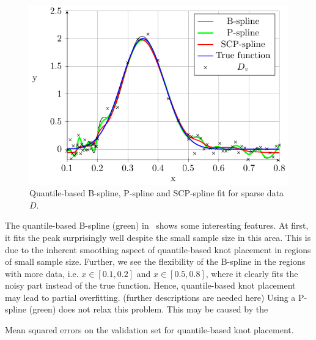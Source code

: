 \begin{figure}[H]
	\centering
	\includegraphics{graphics/pgfplots/cha4/exp-sparse-quantile.pdf}
	\caption{Quantile-based B-spline, P-spline and SCP-spline fit for sparse data $D$.}
	\label{fig:sparse-example-quantile}
\end{figure}

The quantile-based B-spline (green) in~ shows some interesting features. At first, it fits the peak surprisingly well despite the small sample size in this area. This is due to the inherent smoothing aspect of quantile-based knot placement in regions of small sample size. Further, we see the flexibility of the B-spline in the regions with more data, i.e. $x\in[0.1,0.2]$ and $x \in [0.5,0.8]$, where it clearly fits the noisy part instead of the true function. Hence, quantile-based knot placement may lead to partial overfitting. (further descriptions are needed here) Using a P-spline (green) does not relax this problem. This may be caused by the 


\begin{table}[H]
	\begin{center}
	\end{center}
	\caption{Mean squared errors on the validation set for quantile-based knot placement.}
	\label{tab:sparse-example-quantile}
\end{table}



